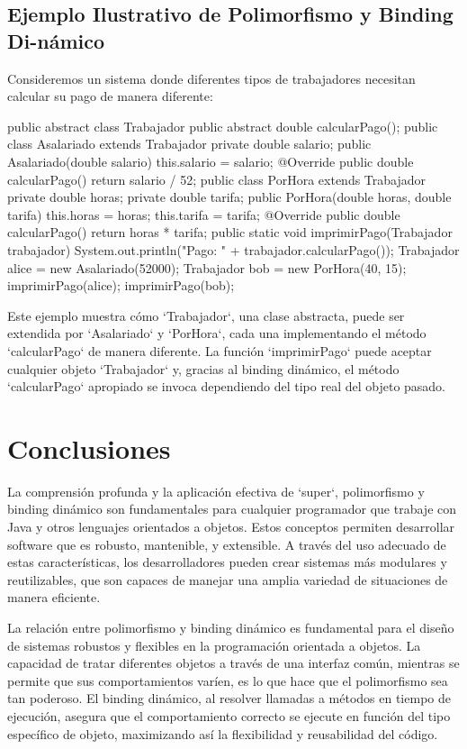 \documentclass[a4paper]{report}
\begin{document}
\subsection{Ejemplo Ilustrativo de Polimorfismo y Binding Di-námico}
Consideremos un sistema donde diferentes tipos de trabajadores necesitan calcular su pago de manera diferente:

\begin{roundedlst}
public abstract class Trabajador {
    public abstract double calcularPago();
}
public class Asalariado extends Trabajador {
    private double salario;
    public Asalariado(double salario) {
        this.salario = salario;
    }
    @Override
    public double calcularPago() {
        return salario / 52;
    }
}
public class PorHora extends Trabajador {
    private double horas;
    private double tarifa;
    public PorHora(double horas, double tarifa) {
        this.horas = horas;
        this.tarifa = tarifa;
    }
    @Override
    public double calcularPago() {
        return horas * tarifa;
    }
}
public static void imprimirPago(Trabajador trabajador) {
    System.out.println("Pago: " 
                       + trabajador.calcularPago());
}
Trabajador alice = new Asalariado(52000);
Trabajador bob = new PorHora(40, 15);
imprimirPago(alice);
imprimirPago(bob);
\end{roundedlst}

Este ejemplo muestra cómo `Trabajador`, una clase abstracta, puede ser extendida por `Asalariado` y `PorHora`, cada una implementando el método `calcularPago` de manera diferente. La función `imprimirPago` puede aceptar cualquier objeto `Trabajador` y, gracias al binding dinámico, el método `calcularPago` apropiado se invoca dependiendo del tipo real del objeto pasado.

\section{Conclusiones}
La comprensión profunda y la aplicación efectiva de `super`, polimorfismo y binding dinámico son fundamentales para cualquier programador que trabaje con Java y otros lenguajes orientados a objetos. Estos conceptos permiten desarrollar software que es robusto, mantenible, y extensible. A través del uso adecuado de estas características, los desarrolladores pueden crear sistemas más modulares y reutilizables, que son capaces de manejar una amplia variedad de situaciones de manera eficiente.

La relación entre polimorfismo y binding dinámico es fundamental para el diseño de sistemas robustos y flexibles en la programación orientada a objetos. La capacidad de tratar diferentes objetos a través de una interfaz común, mientras se permite que sus comportamientos varíen, es lo que hace que el polimorfismo sea tan poderoso. El binding dinámico, al resolver llamadas a métodos en tiempo de ejecución, asegura que el comportamiento correcto se ejecute en función del tipo específico de objeto, maximizando así la flexibilidad y reusabilidad del código.
\end{document}
